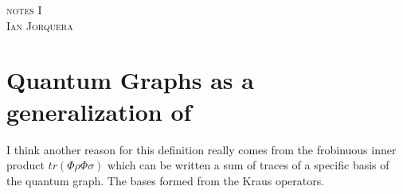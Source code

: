 \documentclass[12pt]{amsart}
\begin{document}
\begin{center}
    \textsc{notes I \\ Ian Jorquera}
\end{center}
\vspace{1em}

\section{Quantum Graphs as a generalization of }
I think another reason for this definition really comes from the frobinuous inner product 
$tr(\Phi \rho\Phi\sigma)$ which can be written a sum of traces of a specific basis of the quantum graph. The bases formed from the Kraus operators.
\end{document}
